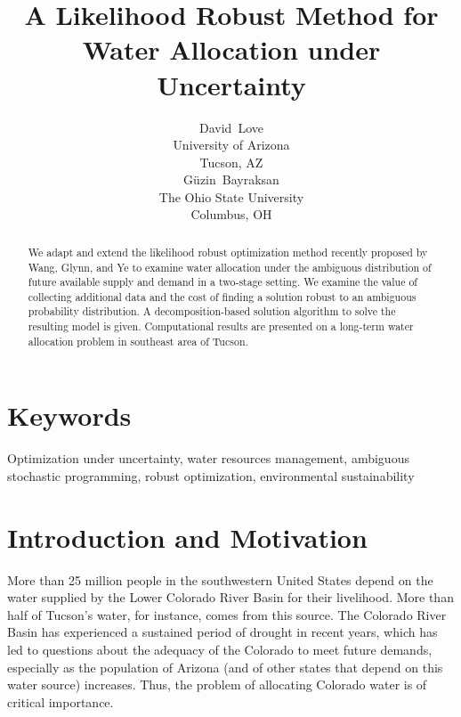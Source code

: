 \documentclass{iserc}
\title{A Likelihood Robust Method for Water Allocation under Uncertainty}
\author{
David~Love\\University of Arizona\\Tucson, AZ \\
\vspace{0.3cm}%
G\"{u}zin~Bayraksan\\The Ohio State University\\Columbus, OH}
\begin{document}
\maketitle

\begin{abstract}
	We adapt and extend the likelihood robust optimization method recently proposed by Wang, Glynn, and Ye to examine water allocation under the ambiguous distribution of future available supply and demand in a two-stage setting.
	We examine the value of collecting additional data and the cost of finding a solution robust to an ambiguous probability distribution.
	A decomposition-based solution algorithm to solve the resulting model is given.
	Computational results are presented on a long-term water allocation problem in southeast area of Tucson.
\end{abstract}

\section*{Keywords}
Optimization under uncertainty, water resources management,  ambiguous stochastic programming, robust optimization, environmental sustainability

\section{Introduction and Motivation}

More than 25 million people in the southwestern United States depend on the water supplied by the Lower Colorado River Basin for their livelihood.
More than half of Tucson's water, for instance, comes from this source.
The Colorado River Basin has experienced a sustained period of drought in recent years, which has led to questions about the adequacy of the Colorado to meet future demands, especially as the population of Arizona (and of other states that depend on this water source) increases.
Thus, the problem of allocating Colorado water is of critical importance. 
 
\end{document}
